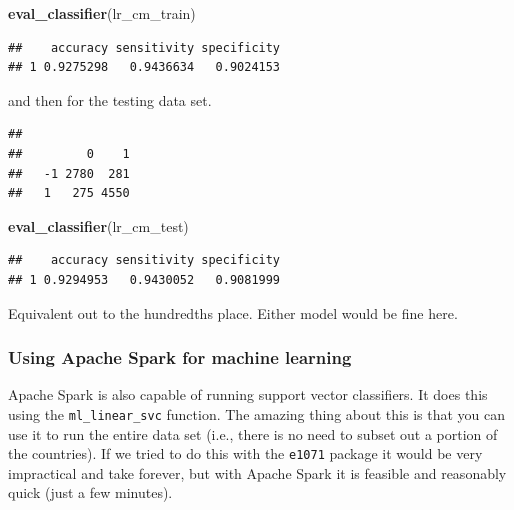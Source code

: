 \documentclass[]{book}
\newenvironment{Shaded}{\begin{snugshade}}{\end{snugshade}}
\newcommand{\DataTypeTok}[1]{\textcolor[rgb]{0.13,0.29,0.53}{#1}}
\newcommand{\KeywordTok}[1]{\textcolor[rgb]{0.13,0.29,0.53}{\textbf{#1}}}
\newcommand{\NormalTok}[1]{#1}
\newcommand{\OperatorTok}[1]{\textcolor[rgb]{0.81,0.36,0.00}{\textbf{#1}}}
\newcommand{\StringTok}[1]{\textcolor[rgb]{0.31,0.60,0.02}{#1}}
\begin{document}
\begin{Shaded}
\begin{Highlighting}[]
\KeywordTok{eval_classifier}\NormalTok{(lr_cm_train)}
\end{Highlighting}
\end{Shaded}

\begin{verbatim}
##    accuracy sensitivity specificity
## 1 0.9275298   0.9436634   0.9024153
\end{verbatim}

and then for the testing data set.

\begin{Shaded}
\end{Shaded}

\begin{verbatim}
##     
##         0    1
##   -1 2780  281
##   1   275 4550
\end{verbatim}

\begin{Shaded}
\begin{Highlighting}[]
\KeywordTok{eval_classifier}\NormalTok{(lr_cm_test)}
\end{Highlighting}
\end{Shaded}

\begin{verbatim}
##    accuracy sensitivity specificity
## 1 0.9294953   0.9430052   0.9081999
\end{verbatim}

Equivalent out to the hundredths place. Either model would be fine here.

\hypertarget{using-apache-spark-for-machine-learning}{%
\subsubsection{Using Apache Spark for machine learning}\label{using-apache-spark-for-machine-learning}}

Apache Spark is also capable of running support vector classifiers. It does this using the \texttt{ml\_linear\_svc} function. The amazing thing about this is that you can use it to run the entire data set (i.e., there is no need to subset out a portion of the countries). If we tried to do this with the \texttt{e1071} package it would be very impractical and take forever, but with Apache Spark it is feasible and reasonably quick (just a few minutes).
\end{document}
